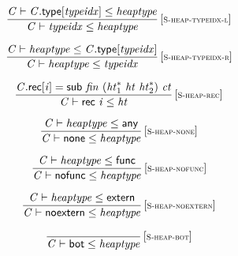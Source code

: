 $$
\begin{array}{@{}c@{}}\displaystyle
\frac{
{\mathit{C}} \vdash {\mathit{C}}.\mathsf{type}{}[{\mathit{typeidx}}] \leq {\mathit{heaptype}}
}{
{\mathit{C}} \vdash {\mathit{typeidx}} \leq {\mathit{heaptype}}
} \, {[\textsc{\scriptsize S{-}heap{-}typeidx{-}l}]}
\qquad
\end{array}
$$

$$
\begin{array}{@{}c@{}}\displaystyle
\frac{
{\mathit{C}} \vdash {\mathit{heaptype}} \leq {\mathit{C}}.\mathsf{type}{}[{\mathit{typeidx}}]
}{
{\mathit{C}} \vdash {\mathit{heaptype}} \leq {\mathit{typeidx}}
} \, {[\textsc{\scriptsize S{-}heap{-}typeidx{-}r}]}
\qquad
\end{array}
$$

$$
\begin{array}{@{}c@{}}\displaystyle
\frac{
{\mathit{C}}.\mathsf{rec}{}[{\mathit{i}}] = \mathsf{sub}~{\mathit{fin}}~({{\mathit{ht}}_{{1}}^\ast}~{\mathit{ht}}~{{\mathit{ht}}_{{2}}^\ast})~{\mathit{ct}}
}{
{\mathit{C}} \vdash \mathsf{rec}~{\mathit{i}} \leq {\mathit{ht}}
} \, {[\textsc{\scriptsize S{-}heap{-}rec}]}
\qquad
\end{array}
$$

$$
\begin{array}{@{}c@{}}\displaystyle
\frac{
{\mathit{C}} \vdash {\mathit{heaptype}} \leq \mathsf{any}
}{
{\mathit{C}} \vdash \mathsf{none} \leq {\mathit{heaptype}}
} \, {[\textsc{\scriptsize S{-}heap{-}none}]}
\qquad
\end{array}
$$

$$
\begin{array}{@{}c@{}}\displaystyle
\frac{
{\mathit{C}} \vdash {\mathit{heaptype}} \leq \mathsf{func}
}{
{\mathit{C}} \vdash \mathsf{nofunc} \leq {\mathit{heaptype}}
} \, {[\textsc{\scriptsize S{-}heap{-}nofunc}]}
\qquad
\end{array}
$$

$$
\begin{array}{@{}c@{}}\displaystyle
\frac{
{\mathit{C}} \vdash {\mathit{heaptype}} \leq \mathsf{extern}
}{
{\mathit{C}} \vdash \mathsf{noextern} \leq {\mathit{heaptype}}
} \, {[\textsc{\scriptsize S{-}heap{-}noextern}]}
\qquad
\end{array}
$$

$$
\begin{array}{@{}c@{}}\displaystyle
\frac{
}{
{\mathit{C}} \vdash \mathsf{bot} \leq {\mathit{heaptype}}
} \, {[\textsc{\scriptsize S{-}heap{-}bot}]}
\qquad
\end{array}
$$

